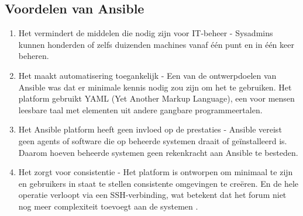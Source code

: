 \subsection{Voordelen van Ansible}
\label{Voordelen van Ansible}

\begin{enumerate}
  \item Het vermindert de middelen die nodig zijn voor IT-beheer - Sysadmins kunnen honderden of zelfs duizenden machines 
  vanaf één punt en in één keer beheren.

  \item Het maakt automatisering toegankelijk - Een van de ontwerpdoelen van Ansible was dat er minimale kennis nodig zou zijn 
  om het te gebruiken. Het platform gebruikt YAML (Yet Another Markup Language), een voor mensen leesbare taal met elementen 
  uit andere gangbare programmeertalen.

  \item Het Ansible platform heeft geen invloed op de prestaties - Ansible vereist geen agents of software die op beheerde 
  systemen draait of geïnstalleerd is. Daarom hoeven beheerde systemen geen rekenkracht aan Ansible te besteden.

  \item Het zorgt voor consistentie - Het platform is ontworpen om minimaal te zijn en gebruikers in staat te stellen consistente 
  omgevingen te creëren. En de hele operatie verloopt via een SSH-verbinding, wat betekent dat het forum niet nog meer 
  complexiteit toevoegt aan de systemen
  \autocite{Manjaly2022}.
\end{enumerate}
